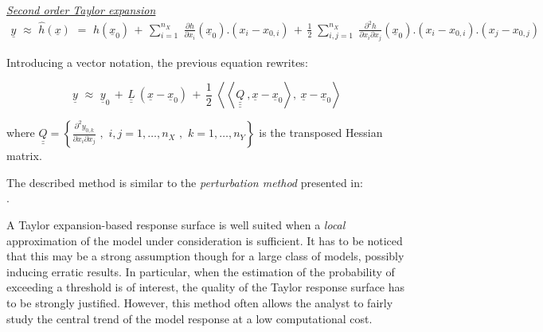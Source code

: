 {\underline{\textit{Second order Taylor expansion}}\\
	\begin{eqnarray*}
			\underline{y} \, \, \approx \, \, \widehat{h}(\underline{x}) \, \, = \, \, 
	 h(\underline{x}_0) \, +  \, \sum_{i=1}^{n_{X}} \;  \frac{\partial h}{\partial x_i}(\underline{x}_0).\left(x_i - x_{0,i} \right) \, + \, \frac{1}{2} \; \sum_{i,j=1}^{n_X} \;  \frac{\partial^2 h}{\partial x_i \partial x_j}(\underline{x}_0).\left(x_i - x_{0,i} \right).\left(x_j - x_{0,j} \right) 
	\end{eqnarray*}
	
Introducing a vector notation, the previous equation rewrites:
	
	$$
	\underline{y} \, \, \approx  \, \,  \underline{y}_0 \, + \,  \underline{\underline{L}} \: \left(\underline{x}-\underline{x}_0\right) \, + \,  \frac{1}{2} \; \left\langle \left\langle\underline{\underline{\underline{Q}}}\:,\underline{x}-\underline{x}_0 \right\rangle,\:\underline{x}-\underline{x}_0 \right\rangle 
	$$
		
	where $\underline{\underline{Q}} = \left\{ \frac{\partial^2 y_{0,k}}{\partial x_i \partial x_j} \, \, , \, \, i,j=1,\ldots, n_X \, \, , \, \, k=1, \ldots, n_Y \right\}$ is the transposed Hessian matrix.
	
}
{The described method is similar to the \textit{perturbation method} presented in: \\
.
}

{A Taylor expansion-based response surface is well suited when a \emph{local} approximation of the model under consideration is sufficient. It has to be noticed that this may be a strong assumption though for a large class of models, possibly inducing erratic results. In particular, when the estimation of the probability of exceeding a threshold is of interest, the quality of the Taylor response surface has to be strongly justified. However, this method often allows the analyst to fairly study the central trend of the model response at a low computational cost.
}



